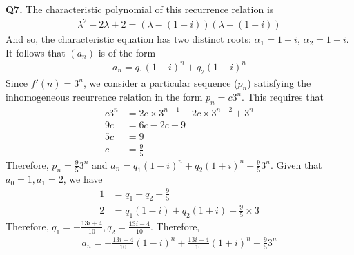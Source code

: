 \documentclass{article}[12pt]
\begin{document}
\noindent \textbf{Q7.}
The characteristic polynomial of this recurrence relation is 
\begin{align*}
\lambda^2-2\lambda+2=(\lambda-(1-i))(\lambda-(1+i))
\end{align*}
And so, the characteristic equation has two distinct roots: $\alpha_1=1-i$, $\alpha_2=1+i$. It follows that $(a_n)$ is of the form 
\begin{align*}
a_n=q_1(1-i)^n+q_2(1+i)^n
\end{align*}
Since $f'(n)=3^n$, we consider a particular sequence ($p_n$) satisfying the inhomogeneous recurrence relation in the form $p_n=c3^n$. This requires that 
\begin{align*}
c3^n&=2c\times 3^{n-1}-2c\times 3^{n-2}+ 3^n\\
9c&=6c-2c+9\\
5c&=9\\
c&=\frac{9}{5}
\end{align*}
Therefore, $p_n=\frac{9}{5}3^n$ and $a_n=q_1(1-i)^n+q_2(1+i)^n+\frac{9}{5}3^n$. Given that $a_0=1,a_1=2$, we have 
\begin{align*}
1&=q_1+q_2+\frac{9}{5}\\
2&=q_1(1-i)+q_2(1+i)+\frac{9}{5}\times 3
\end{align*}
Therefore, $q_1=-\frac{13i+4}{10},q_2=\frac{13i-4}{10}$. Therefore, 
\begin{align*}
a_n=-\frac{13i+4}{10}(1-i)^n+\frac{13i-4}{10}(1+i)^n+\frac{9}{5}3^n
\end{align*}
\end{document}
